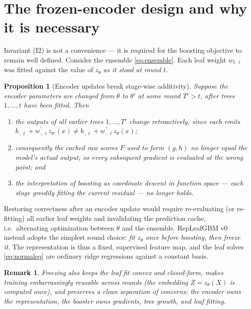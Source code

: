 \documentclass[11pt]{article}
\newtheorem{proposition}{Proposition}
\newtheorem{remark}{Remark}
\newcommand{\zt}{z_{\theta}}
\newcommand{\trans}{^{\top}}
\begin{document}
\section{The frozen-encoder design and why it is necessary}
\label{sec:freeze}

Invariant (I2) is not a convenience --- it is required for the boosting objective to
remain well defined. Consider the ensemble \eqref{eq:ensemble}. Each leaf weight
$w_{t,\ell}$ was fitted against the value of $\zt$ \emph{as it stood at round $t$}.

\begin{proposition}[Encoder updates break stage-wise additivity]
\label{prop:freeze}
Suppose the encoder parameters are changed from $\theta$ to $\theta'$ at some round
$T' > t$, after trees $1,\dots,t$ have been fitted. Then
\begin{enumerate}
\item the outputs of all earlier trees $1,\dots,T'$ change retroactively, since each
  emits $b_{\cdot,\ell} + w_{\cdot,\ell}^{\!\trans} z_{\theta'}(x) \neq
  b_{\cdot,\ell} + w_{\cdot,\ell}^{\!\trans} z_{\theta}(x)$;
\item consequently the cached raw scores $F$ used to form $(g,h)$ no longer equal the
  model's actual output, so every subsequent gradient is evaluated at the wrong point;
  and
\item the interpretation of boosting as coordinate descent in function space --- each
  stage greedily fitting the current residual --- no longer holds.
\end{enumerate}
\end{proposition}

Restoring correctness after an encoder update would require re-evaluating (or
re-fitting) all earlier leaf weights and invalidating the prediction cache, i.e.\
alternating optimization between $\theta$ and the ensemble. RepLeafGBM v0 instead
adopts the simplest sound choice: \emph{fit $\zt$ once before boosting, then freeze
it}. The representation is thus a fixed, supervised feature map, and the leaf solves
\eqref{eq:normaleq} are ordinary ridge regressions against a constant basis.

\begin{remark}
Freezing also keeps the leaf fit convex and closed-form, makes training embarrassingly
reusable across rounds (the embedding $Z = \zt(X)$ is computed once), and preserves a
clean separation of concerns: the encoder owns the representation, the booster owns
gradients, tree growth, and leaf fitting.
\end{remark}
\end{document}
